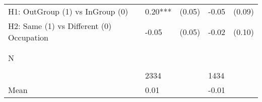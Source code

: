 \begin{tabular}{l*{4}{l}}
H1: OutGroup (1) vs InGroup (0)&     0.20***&   (0.05)&    -0.05   &   (0.09)\\
 
H2: Same (1) vs Different (0) Occupation&    -0.05   &   (0.05)&    -0.02   &   (0.10)\\
 
  \\\\[-0.5cm] N \\\\[-0.6cm]&     2334   &         &     1434   &         \\
Mean            &     0.01&         &    -0.01&         \\
 
\bottomrule  \end{tabular}  
